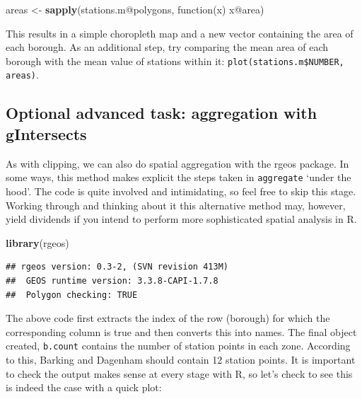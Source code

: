 \documentclass[]{article}
\newenvironment{Shaded}{}{}
\newcommand{\KeywordTok}[1]{\textcolor[rgb]{0.00,0.44,0.13}{\textbf{{#1}}}}
\newcommand{\DataTypeTok}[1]{\textcolor[rgb]{0.56,0.13,0.00}{{#1}}}
\newcommand{\DecValTok}[1]{\textcolor[rgb]{0.25,0.63,0.44}{{#1}}}
\newcommand{\CommentTok}[1]{\textcolor[rgb]{0.38,0.63,0.69}{\textit{{#1}}}}
\newcommand{\OtherTok}[1]{\textcolor[rgb]{0.00,0.44,0.13}{{#1}}}
\newcommand{\NormalTok}[1]{{#1}}
\begin{document}
\begin{Shaded}
\begin{Highlighting}[]
\NormalTok{areas <- }\KeywordTok{sapply}\NormalTok{(stations.m@polygons, function(x) x@area)}
\end{Highlighting}
\end{Shaded}
This results in a simple choropleth map and a new vector containing the
area of each borough. As an additional step, try comparing the mean area
of each borough with the mean value of stations within it:
\texttt{plot(stations.m\$NUMBER, areas)}.

\subsection{Optional advanced task: aggregation with gIntersects}

As with clipping, we can also do spatial aggregation with the rgeos
package. In some ways, this method makes explicit the steps taken in
\texttt{aggregate} `under the hood'. The code is quite involved and
intimidating, so feel free to skip this stage. Working through and
thinking about it this alternative method may, however, yield dividends
if you intend to perform more sophisticated spatial analysis in R.

\begin{Shaded}
\begin{Highlighting}[]
\KeywordTok{library}\NormalTok{(rgeos)}
\end{Highlighting}
\end{Shaded}
\begin{verbatim}
## rgeos version: 0.3-2, (SVN revision 413M)
##  GEOS runtime version: 3.3.8-CAPI-1.7.8 
##  Polygon checking: TRUE
\end{verbatim}
\begin{Shaded}
\end{Shaded}
The above code first extracts the index of the row (borough) for which
the corresponding column is true and then converts this into names. The
final object created, \texttt{b.count} contains the number of station
points in each zone. According to this, Barking and Dagenham should
contain 12 station points. It is important to check the output makes
sense at every stage with R, so let's check to see this is indeed the
case with a quick plot:
\end{document}
